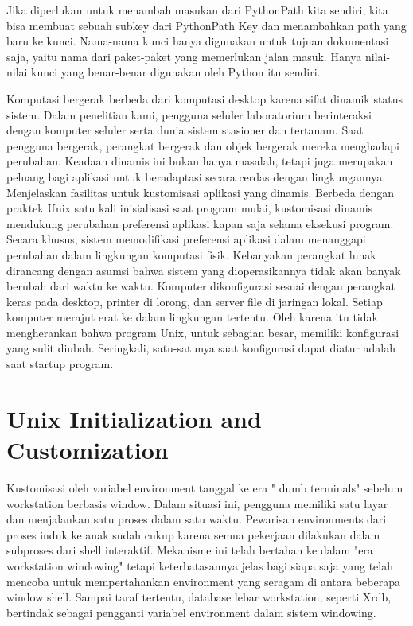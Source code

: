 Jika diperlukan untuk menambah masukan dari PythonPath kita sendiri, kita bisa membuat sebuah subkey dari PythonPath Key dan menambahkan path yang baru ke kunci. Nama-nama kunci hanya digunakan untuk tujuan dokumentasi saja, yaitu nama dari paket-paket yang memerlukan jalan masuk. Hanya nilai-nilai kunci yang benar-benar digunakan oleh Python itu sendiri. \cite{hammond2000python}

Komputasi bergerak berbeda dari komputasi desktop karena sifat dinamik status sistem. Dalam penelitian kami, pengguna seluler laboratorium berinteraksi dengan komputer seluler serta dunia sistem stasioner dan tertanam. Saat pengguna bergerak, perangkat bergerak dan objek bergerak mereka menghadapi perubahan. Keadaan dinamis ini bukan hanya masalah, tetapi juga merupakan peluang bagi aplikasi untuk beradaptasi secara cerdas dengan lingkungannya.
Menjelaskan fasilitas untuk kustomisasi aplikasi yang dinamis. Berbeda dengan praktek Unix satu kali inisialisasi saat program mulai, kustomisasi dinamis mendukung perubahan preferensi aplikasi kapan saja selama eksekusi program. Secara khusus, sistem memodifikasi preferensi aplikasi dalam menanggapi perubahan dalam lingkungan komputasi fisik.
Kebanyakan perangkat lunak dirancang dengan asumsi bahwa sistem yang dioperasikannya tidak akan banyak berubah dari waktu ke waktu. Komputer dikonfigurasi sesuai dengan perangkat keras pada desktop, printer di lorong, dan server file di jaringan lokal. Setiap komputer merajut erat ke dalam lingkungan tertentu. Oleh karena itu tidak mengherankan bahwa program Unix, untuk sebagian besar, memiliki konfigurasi yang sulit diubah. Seringkali, satu-satunya saat konfigurasi dapat diatur adalah saat startup program.


\section {Unix Initialization and Customization}

Kustomisasi oleh variabel environment tanggal ke era " dumb terminals" sebelum workstation berbasis window. Dalam situasi ini, pengguna memiliki satu layar dan menjalankan satu proses dalam satu waktu. Pewarisan environments dari proses induk ke anak sudah cukup karena semua pekerjaan dilakukan dalam subproses dari shell interaktif. Mekanisme ini telah bertahan ke dalam "era workstation windowing" tetapi keterbatasannya jelas bagi siapa saja yang telah mencoba untuk mempertahankan environment yang seragam di antara beberapa window shell. Sampai taraf tertentu, database lebar workstation, seperti Xrdb, bertindak sebagai pengganti variabel environment dalam sistem windowing. \cite{schilit1993customizing}

